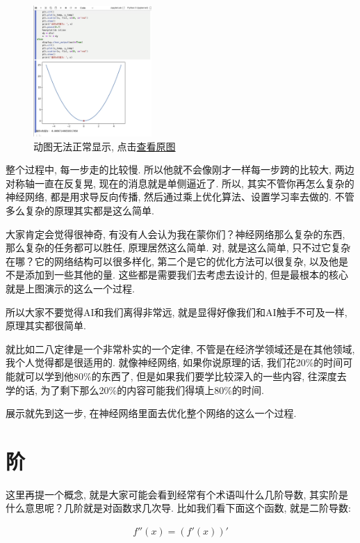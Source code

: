 \begin{figure}[ht]
  \centering
  \includegraphics[width=0.4\textwidth]{asset/截屏2023-12-31 12.50.40.png}
  \caption{动图无法正常显示, 点击\href{https://raw.githubusercontent.com/hivandu/notes/main/img/20230830160512.gif}{查看原图}}
  \label{fig:img10_4}
\end{figure}

整个过程中, 每一步走的比较慢. 所以他就不会像刚才一样每一步跨的比较大, 两边对称轴一直在反复晃, 现在的消息就是单侧逼近了. 所以, 其实不管你再怎么复杂的神经网络, 都是用求导反向传播, 然后通过乘上优化算法、设置学习率去做的. 不管多么复杂的原理其实都是这么简单. 

大家肯定会觉得很神奇, 有没有人会认为我在蒙你们？神经网络那么复杂的东西, 那么复杂的任务都可以胜任, 原理居然这么简单. 对, 就是这么简单, 只不过它复杂在哪？它的网络结构可以很多样化, 第二个是它的优化方法可以很复杂, 以及他是不是添加到一些其他的量. 这些都是需要我们去考虑去设计的, 但是最根本的核心就是上图演示的这么一个过程. 

所以大家不要觉得AI和我们离得非常远, 就是显得好像我们和AI触手不可及一样, 原理其实都很简单. 

就比如二八定律是一个非常朴实的一个定律, 不管是在经济学领域还是在其他领域, 我个人觉得都是很适用的. 就像神经网络, 如果你说原理的话, 我们花20\%的时间可能就可以学到他80\%的东西了, 但是如果我们要学比较深入的一些内容, 往深度去学的话, 为了剩下那么20\%的内容可能我们得填上80\%的时间. 

展示就先到这一步, 在神经网络里面去优化整个网络的这么一个过程. 

\section{阶}

这里再提一个概念, 就是大家可能会看到经常有个术语叫什么几阶导数, 其实阶是什么意思呢？几阶就是对函数求几次导. 比如我们看下面这个函数, 就是二阶导数: 

\begin{align*}
  f''(x) = (f'(x))'
\end{align*}


